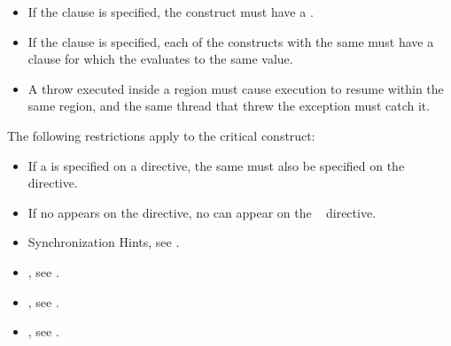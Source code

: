 
\restrictions
\begin{itemize}
\item If the  clause is specified, the  
      construct must have a .
\item If the  clause is specified, each of the
   constructs with the same  must have a
   clause for which the  evaluates to the same
  value.

\end{itemize}

\begin{cppspecific}
\begin{itemize}
\item A throw executed inside a  region must cause execution to resume within 
the same  region, and the same thread that threw the exception must catch 
it.
\end{itemize}
\end{cppspecific}

\begin{fortranspecific}
The following restrictions apply to the critical construct:

\begin{itemize}
\item If a  is specified on a  directive, the same  must also be 
specified on the ~ directive. 

\item If no  appears on the  directive, no  can appear on the 
~ directive.
\end{itemize}
\end{fortranspecific}

\crossreferences
\begin{itemize}
\item Synchronization Hints, see
.

\item {}, see
.

\item {}, see
.

\item {}, see
.

\end{itemize}









